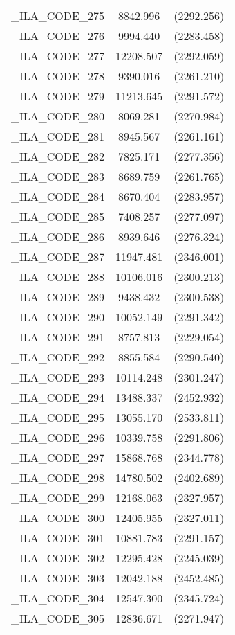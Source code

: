 {\begin{table}[htbp]
\begin{tabular}{l c c }
\_ILA\_CODE\_275  &  8842.996  & (2292.256)\\
\_ILA\_CODE\_276  &  9994.440  & (2283.458)\\
\_ILA\_CODE\_277  &  12208.507  & (2292.059)\\
\_ILA\_CODE\_278  &  9390.016  & (2261.210)\\
\_ILA\_CODE\_279  &  11213.645  & (2291.572)\\
\_ILA\_CODE\_280  &  8069.281  & (2270.984)\\
\_ILA\_CODE\_281  &  8945.567  & (2261.161)\\
\_ILA\_CODE\_282  &  7825.171  & (2277.356)\\
\_ILA\_CODE\_283  &  8689.759  & (2261.765)\\
\_ILA\_CODE\_284  &  8670.404  & (2283.957)\\
\_ILA\_CODE\_285  &  7408.257  & (2277.097)\\
\_ILA\_CODE\_286  &  8939.646  & (2276.324)\\
\_ILA\_CODE\_287  &  11947.481  & (2346.001)\\
\_ILA\_CODE\_288  &  10106.016  & (2300.213)\\
\_ILA\_CODE\_289  &  9438.432  & (2300.538)\\
\_ILA\_CODE\_290  &  10052.149  & (2291.342)\\
\_ILA\_CODE\_291  &  8757.813  & (2229.054)\\
\_ILA\_CODE\_292  &  8855.584  & (2290.540)\\
\_ILA\_CODE\_293  &  10114.248  & (2301.247)\\
\_ILA\_CODE\_294  &  13488.337  & (2452.932)\\
\_ILA\_CODE\_295  &  13055.170  & (2533.811)\\
\_ILA\_CODE\_296  &  10339.758  & (2291.806)\\
\_ILA\_CODE\_297  &  15868.768  & (2344.778)\\
\_ILA\_CODE\_298  &  14780.502  & (2402.689)\\
\_ILA\_CODE\_299  &  12168.063  & (2327.957)\\
\_ILA\_CODE\_300  &  12405.955  & (2327.011)\\
\_ILA\_CODE\_301  &  10881.783  & (2291.157)\\
\_ILA\_CODE\_302  &  12295.428  & (2245.039)\\
\_ILA\_CODE\_303  &  12042.188  & (2452.485)\\
\_ILA\_CODE\_304  &  12547.300  & (2345.724)\\
\_ILA\_CODE\_305  &  12836.671  & (2271.947)\\

\end{tabular}
\end{table}}
